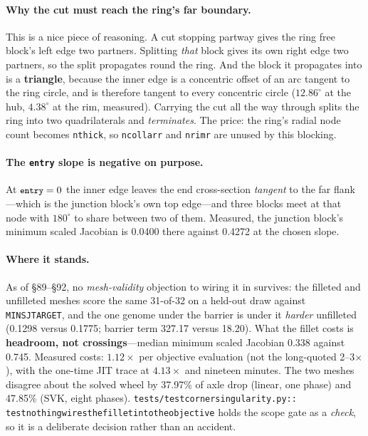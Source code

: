 \documentclass[11pt,a4paper]{article}
\DeclareRobustCommand{\code}[1]{%
  \texttt{\small\def\_{\textunderscore\discretionary{}{}{}}#1}}
\begin{document}
\paragraph{Why the cut must reach the ring's far boundary.}
This is a nice piece of reasoning. A cut stopping partway gives the ring free block's
left edge two partners. Splitting \emph{that} block gives its own right edge two
partners, so the split propagates round the ring. And the block it propagates into is a
\textbf{triangle}, because the inner edge is a concentric offset of an arc tangent to
the ring circle, and is therefore tangent to every concentric circle ($12.86^\circ$ at
the hub, $4.38^\circ$ at the rim, measured). Carrying the cut all the way through splits
the ring into two quadrilaterals and \emph{terminates}. The price: the ring's radial
node count becomes \code{n\_thick}, so \code{n\_collar\_r} and \code{n\_rim\_r} are
unused by this blocking.

\paragraph{The \code{entry} slope is negative on purpose.}
At $\code{entry} = 0$ the inner edge leaves the end cross-section \emph{tangent} to the
far flank---which is the junction block's own top edge---and three blocks meet at that
node with $180^\circ$ to share between two of them. Measured, the junction block's
minimum scaled Jacobian is 0.0400 there against 0.4272 at the chosen slope.

\paragraph{Where it stands.}
As of \S89--\S92, no \emph{mesh-validity} objection to wiring it in survives: the
filleted and unfilleted meshes score the same 31-of-32 on a held-out draw against
\code{MIN\_SJ\_TARGET}, and the one genome under the barrier is under it \emph{harder}
unfilleted (0.1298 versus 0.1775; barrier term 327.17 versus 18.20). What the fillet
costs is \textbf{headroom, not crossings}---median minimum scaled Jacobian 0.338 against
0.745. Measured costs: $1.12\times$ per objective evaluation (not the long-quoted
2--3$\times$), with the one-time JIT trace at $4.13\times$ and nineteen minutes. The two
meshes disagree about the solved wheel by 37.97\% of axle drop (linear, one phase) and
47.85\% (SVK, eight phases).
\code{tests/test\_corner\_singularity.py::}\allowbreak
\code{test\_nothing\_wires\_the\_fillet\_into\_the\_objective}
holds the scope gate as a \emph{check}, so it is a deliberate decision rather than an
accident.
\end{document}
